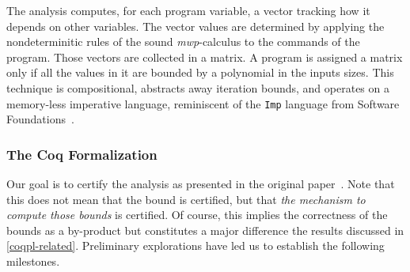 The analysis computes, for each program variable, a vector tracking how it depends on other variables.
The vector values are determined by applying the nondeterminitic rules of the sound \emph{mwp}-calculus to the commands of the program.
Those vectors are collected in a matrix.
A program is assigned a matrix only if all the values in it are bounded by a polynomial in the inputs sizes.
This technique is compositional, abstracts away \eg iteration bounds, and operates on
a memory-less imperative language, reminiscent of the \texttt{Imp} language from Software Foundations~\cite%
{cpierce20221}.



\subsubsection{The Coq Formalization}

Our goal is to certify the analysis as presented in the original paper~\cite{jones2009}.
Note that this does not mean that the bound is certified, but that \emph{the mechanism to compute those bounds} is certified.
Of course, this implies the correctness of the bounds as a by-product but constitutes a major difference \wrt the results discussed in \autoref{coqpl-related}.
%
Preliminary explorations have led us to establish the following milestones.

